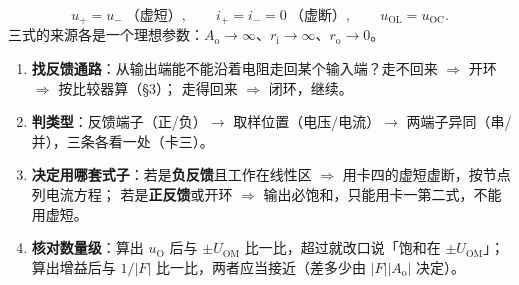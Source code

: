 \documentclass[11pt]{ctexart}
\begin{document}
\begin{cbox}
\[
u_+=u_-\ \text{（虚短）},\qquad i_+=i_-=0\ \text{（虚断）},\qquad u_{\mathrm{OL}}=u_{\mathrm{OC}} .
\]
三式的来源各是一个理想参数：$A_{\mathrm{o}}\to\infty$、$r_{\mathrm{i}}\to\infty$、$r_{\mathrm{o}}\to0$。
\end{cbox}


\begin{enumerate}
\item \textbf{找反馈通路}：从输出端能不能沿着电阻走回某个输入端？走不回来 $\Rightarrow$ 开环 $\Rightarrow$ 按比较器算（§3）；
走得回来 $\Rightarrow$ 闭环，继续。
\item \textbf{判类型}：反馈端子（正/负）$\to$ 取样位置（电压/电流）$\to$ 两端子异同（串/并），三条各看一处（卡三）。
\item \textbf{决定用哪套式子}：若是\textbf{负反馈}且工作在线性区 $\Rightarrow$ 用卡四的虚短虚断，按节点列电流方程；
若是\textbf{正反馈}或开环 $\Rightarrow$ 输出必饱和，只能用卡一第二式，不能用虚短。
\item \textbf{核对数量级}：算出 $u_{\mathrm{O}}$ 后与 $\pm U_{\mathrm{OM}}$ 比一比，超过就改口说「饱和在 $\pm U_{\mathrm{OM}}$」；
算出增益后与 $1/|F|$ 比一比，两者应当接近（差多少由 $|F||A_{\mathrm{o}}|$ 决定）。
\end{enumerate}

\end{document}
